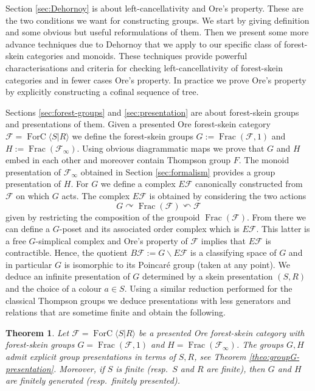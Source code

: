 \documentclass[a4paper, 12pt]{amsart}
\numberwithin{equation}{section}
\newtheorem{lettertheo}{Theorem}
\theoremstyle{definition}
\newcommand{\act}{\curvearrowright}
\newcommand{\bs}{\backslash}
\newcommand{\cF}{\mathcal F}
\DeclareMathOperator{\Frac}{Frac}
\DeclareMathOperator{\FC}{ForC}
\newcommand{\la}{\langle}
\newcommand{\ra}{\rangle}
\begin{document}
Section \ref{sec:Dehornoy} is about left-cancellativity and Ore's property. These are the two conditions we want for constructing groups.
We start by giving definition and some obvious but useful reformulations of them. 
Then we present some more advance techniques due to Dehornoy that we apply to our specific class of forest-skein categories and monoids. 
These techniques provide powerful characterisations and criteria for checking left-cancellativity of forest-skein categories and in fewer cases Ore's property.
In practice we prove Ore's property by explicitly constructing a cofinal sequence of tree.

Sections \ref{sec:forest-groups} and \ref{sec:presentation} are about forest-skein groups and presentations of them.
Given a presented Ore forest-skein category $\cF=\FC\la S|R\ra$ we define the forest-skein groups $G:=\Frac(\cF,1)$ and $H:=\Frac(\cF_\infty).$
Using obvious diagrammatic maps we prove that $G$ and $H$ embed in each other and moreover contain Thompson group $F$.
The monoid presentation of $\cF_\infty$ obtained in Section \ref{sec:formalism} provides a group presentation of $H$.
For $G$ we define a complex $E\cF$ canonically constructed from $\cF$ on which $G$ acts. 
The complex $E\cF$ is obtained by considering the two actions 
$$G\act \Frac(\cF)\curvearrowleft \cF$$
given by restricting the composition of the groupoid $\Frac(\cF)$.
From there we can define a $G$-poset and its associated order complex which is $E\cF$.
This latter is a free $G$-simplical complex and Ore's property of $\cF$ implies that $E\cF$ is contractible.
Hence, the quotient $B\cF:=G\bs E\cF$ is a classifying space of $G$ and in particular $G$ is isomorphic to its Poincar\'e group (taken at any point).
We deduce an infinite presentation of $G$ determined by a skein presentation $(S,R)$ and the choice of a colour $a\in S$.
Using a similar reduction performed for the classical Thompson groups we deduce presentations with less generators and relations that are sometime finite and obtain the following.

\begin{lettertheo}
Let $\cF=\FC\la S|R\ra$ be a presented Ore forest-skein category with forest-skein groups $G=\Frac(\cF,1)$ and $H=\Frac(\cF_\infty)$.
The groups $G,H$ admit explicit group presentations in terms of $S,R$, see Theorem \ref{theo:groupG-presentation}.
Moreover, if $S$ is finite (resp.~$S$ and $R$ are finite), then $G$ and $H$ are finitely generated (resp.~finitely presented).
\end{lettertheo}
\end{document}
